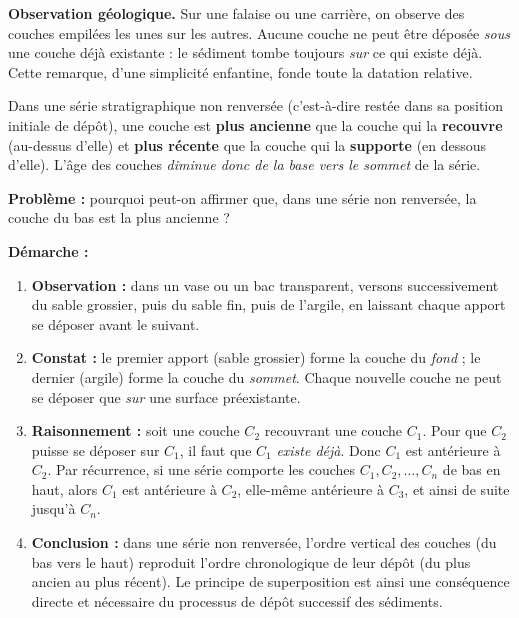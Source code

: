 \documentclass[11pt]{article}
\newcommand{\cle}[1]{{\popxbold\color{popdark}#1}}
\begin{document}
\textbf{Observation géologique.} Sur une falaise ou une carrière, on observe des couches empilées les unes sur les autres. Aucune couche ne peut être déposée \emph{sous} une couche déjà existante : le sédiment tombe toujours \emph{sur} ce qui existe déjà. Cette remarque, d'une simplicité enfantine, fonde toute la datation relative.

\begin{propriete}
Dans une série stratigraphique \cle{non renversée} (c'est-à-dire restée dans sa position initiale de dépôt), une couche est \textbf{plus ancienne} que la couche qui la \textbf{recouvre} (au-dessus d'elle) et \textbf{plus récente} que la couche qui la \textbf{supporte} (en dessous d'elle). L'âge des couches \emph{diminue donc de la base vers le sommet} de la série.
\end{propriete}

\begin{experience}
\textbf{Problème :} pourquoi peut-on affirmer que, dans une série non renversée, la couche du bas est la plus ancienne ?

\textbf{Démarche :}
\begin{enumerate}
\item \textbf{Observation :} dans un vase ou un bac transparent, versons successivement du sable grossier, puis du sable fin, puis de l'argile, en laissant chaque apport se déposer avant le suivant.
\item \textbf{Constat :} le premier apport (sable grossier) forme la couche du \emph{fond} ; le dernier (argile) forme la couche du \emph{sommet}. Chaque nouvelle couche ne peut se déposer que \emph{sur} une surface préexistante.
\item \textbf{Raisonnement :} soit une couche $C_2$ recouvrant une couche $C_1$. Pour que $C_2$ puisse se déposer sur $C_1$, il faut que $C_1$ \emph{existe déjà}. Donc $C_1$ est antérieure à $C_2$. Par récurrence, si une série comporte les couches $C_1, C_2, \ldots, C_n$ de bas en haut, alors $C_1$ est antérieure à $C_2$, elle-même antérieure à $C_3$, et ainsi de suite jusqu'à $C_n$.
\item \textbf{Conclusion :} dans une série non renversée, l'ordre vertical des couches (du bas vers le haut) reproduit l'ordre chronologique de leur dépôt (du plus ancien au plus récent). Le principe de superposition est ainsi une conséquence directe et nécessaire du processus de dépôt successif des sédiments.
\end{enumerate}
\end{experience}
\end{document}

